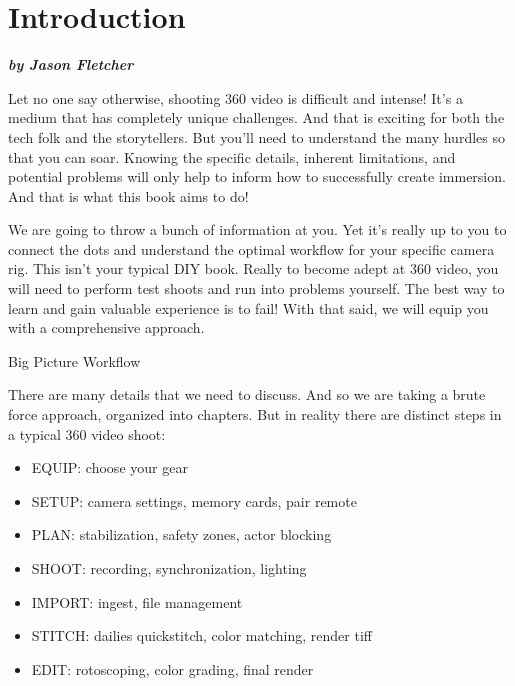 
\SkipTocEntry\chapter*{Introduction}
\addtocounter{section}{2}
\begin{fullwidth}

{\itshape\bfseries by Jason Fletcher

}

Let no one say otherwise, shooting 360 video is difficult and intense! It’s a medium that has completely unique challenges. And that is exciting for both the tech folk and the storytellers. But you’ll need to understand the many hurdles so that you can soar. Knowing the specific details, inherent limitations, and potential problems will only help to inform how to successfully create immersion. And that is what this book aims to do!

We are going to throw a bunch of information at you. Yet it's really up to you to connect the dots and understand the optimal workflow for your specific camera rig. This isn’t your typical DIY book. Really to become adept at 360 video, you will need to perform test shoots and run into problems yourself. The best way to learn and gain valuable experience is to fail! With that said, we will equip you with a comprehensive approach.

{\large Big Picture Workflow\par}

There are many details that we need to discuss. And so we are taking a brute force approach, organized into chapters. But in reality there are distinct steps in a typical 360 video shoot:

\begin{itemize}
\item EQUIP: choose your gear
\item SETUP: camera settings, memory cards, pair remote
\item PLAN: stabilization, safety zones, actor blocking
\item SHOOT: recording, synchronization, lighting
\item IMPORT: ingest, file management 
\item STITCH: dailies quickstitch, color matching, render tiff
\item EDIT: rotoscoping, color grading, final render
\end{itemize}

\clearpage
\end{fullwidth}
